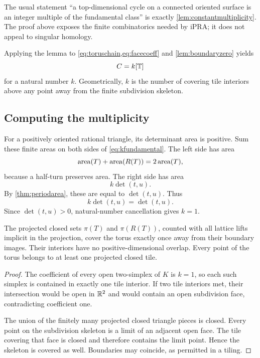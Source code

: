 The usual statement ``a top-dimensional cycle on a connected oriented surface is an integer multiple of the fundamental class'' is exactly \cref{lem:constantmultiplicity}.  The proof above exposes the finite combinatorics needed by iPRA; it does not appeal to singular homology.

Applying the lemma to \cref{eq:toruschain,eq:facecoeff} and \cref{lem:boundaryzero} yields
\begin{equation}
 C=k[\mathbb T]
 \label{eq:kfundamental}
\end{equation}
for a natural number \(k\).  Geometrically, \(k\) is the number of covering tile interiors above any point away from the finite subdivision skeleton.

\subsection{Computing the multiplicity}

For a positively oriented rational triangle, its determinant area is positive.  Sum these finite areas on both sides of \cref{eq:kfundamental}.  The left side has area
\[
 \operatorname{area}(T)+\operatorname{area}(R(T))=2\operatorname{area}(T),
\]
because a half-turn preserves area.  The right side has area
\[
 k\det(t,u).
\]
By \cref{thm:periodarea}, these are equal to \(\det(t,u)\).  Thus
\begin{equation}
 k\det(t,u)=\det(t,u).
 \label{eq:kcancel}
\end{equation}
Since \(\det(t,u)>0\), natural-number cancellation gives \(k=1\).

\begin{theorem}
\label{thm:toruspartition}
The projected closed sets \(\pi(T)\) and \(\pi(R(T))\), counted with all lattice lifts implicit in the projection, cover the torus exactly once away from their boundary images.  Their interiors have no positive-dimensional overlap.  Every point of the torus belongs to at least one projected closed tile.
\end{theorem}
\begin{proof}
The coefficient of every open two-simplex of \(K\) is \(k=1\), so each such simplex is contained in exactly one tile interior.  If two tile interiors met, their intersection would be open in \(\mathbb R^2\) and would contain an open subdivision face, contradicting coefficient one.

The union of the finitely many projected closed triangle pieces is closed.  Every point on the subdivision skeleton is a limit of an adjacent open face.  The tile covering that face is closed and therefore contains the limit point.  Hence the skeleton is covered as well.  Boundaries may coincide, as permitted in a tiling.
\end{proof}

